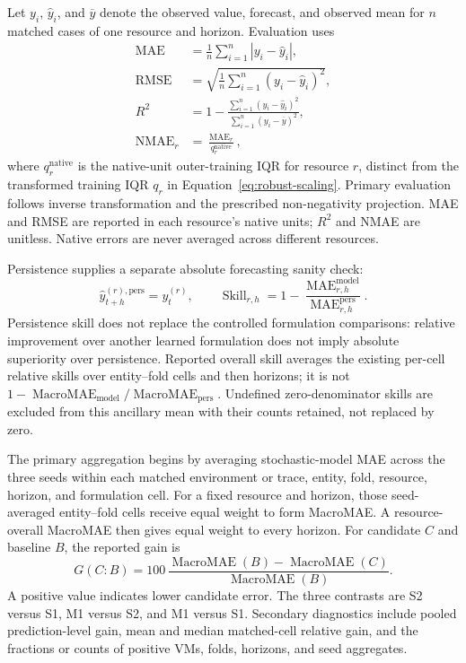 \documentclass[a4paper,fleqn]{cas-dc}
\begin{document}
Let $y_i$, $\widehat{y}_i$, and $\overline{y}$ denote the observed value,
forecast, and observed mean for $n$ matched cases of one resource and horizon.
Evaluation uses
\begin{equation}
  \begin{aligned}
    \operatorname{MAE} &= \frac{1}{n}\sum_{i=1}^{n}|y_i-\widehat{y}_i|, \\
    \operatorname{RMSE} &=
      \sqrt{\frac{1}{n}\sum_{i=1}^{n}(y_i-\widehat{y}_i)^2}, \\
    R^2 &= 1-
      \frac{\sum_{i=1}^{n}(y_i-\widehat{y}_i)^2}
           {\sum_{i=1}^{n}(y_i-\overline{y})^2}, \\
    \operatorname{NMAE}_r &= \frac{\operatorname{MAE}_r}{q_r^{\mathrm{native}}},
  \end{aligned}
  \label{eq:evaluation-metrics}
\end{equation}
where $q_r^{\mathrm{native}}$ is the native-unit outer-training IQR for resource
$r$, distinct from the transformed training IQR $q_r$ in
Equation~\ref{eq:robust-scaling}. Primary evaluation follows inverse
transformation and the prescribed non-negativity projection. MAE and RMSE are
reported in each resource's native units; $R^2$ and NMAE are unitless.  Native
errors are never averaged across different resources.

Persistence supplies a separate absolute forecasting sanity check:
\begin{equation}
  \widehat{y}_{t+h}^{(r),\mathrm{pers}}=y_t^{(r)},
  \qquad
  \operatorname{Skill}_{r,h}
  =1-\frac{\operatorname{MAE}_{r,h}^{\mathrm{model}}}
           {\operatorname{MAE}_{r,h}^{\mathrm{pers}}}.
  \label{eq:persistence-skill}
\end{equation}
Persistence skill does not replace the controlled formulation comparisons:
relative improvement over another learned formulation does not imply absolute
superiority over persistence. Reported overall skill averages the existing
per-cell relative skills over entity--fold cells and then horizons; it is not
$1-\operatorname{MacroMAE}_{\mathrm{model}}/
\operatorname{MacroMAE}_{\mathrm{pers}}$. Undefined zero-denominator skills
are excluded from this ancillary mean with their counts retained, not
replaced by zero.

The primary aggregation begins by averaging stochastic-model MAE across the
three seeds within each matched environment or trace, entity, fold, resource,
horizon, and formulation cell.  For a fixed resource and horizon, those
seed-averaged entity--fold cells receive equal weight to form MacroMAE. A
resource-overall MacroMAE then gives equal weight to every horizon.  For
candidate $C$ and baseline $B$, the reported gain is
\begin{equation}
  G(C\!:\!B)=100\,
  \frac{\operatorname{MacroMAE}(B)-\operatorname{MacroMAE}(C)}
       {\operatorname{MacroMAE}(B)}.
  \label{eq:macro-gain}
\end{equation}
A positive value indicates lower candidate error.  The three contrasts are S2
versus S1, M1 versus S2, and M1 versus S1.  Secondary diagnostics include
pooled prediction-level gain, mean and median matched-cell relative gain, and
the fractions or counts of positive VMs, folds, horizons, and seed aggregates.
\end{document}

